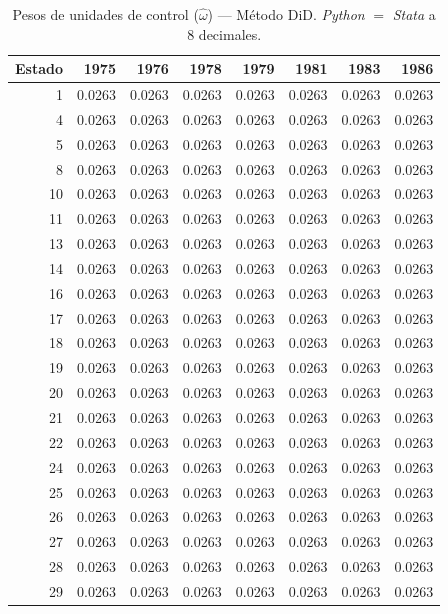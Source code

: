 \begin{table}[H]
\centering
\caption{Pesos de unidades de control ($\hat{\omega}$) --- M\'etodo DiD. \textit{Python} $=$ \textit{Stata} a 8 decimales.}
\label{tab:omega_did}
\small
\begin{tabular}{rrrrrrrr}
\toprule
Estado & 1975 & 1976 & 1978 & 1979 & 1981 & 1983 & 1986 \\
\midrule
1 & 0.0263 & 0.0263 & 0.0263 & 0.0263 & 0.0263 & 0.0263 & 0.0263 \\
4 & 0.0263 & 0.0263 & 0.0263 & 0.0263 & 0.0263 & 0.0263 & 0.0263 \\
5 & 0.0263 & 0.0263 & 0.0263 & 0.0263 & 0.0263 & 0.0263 & 0.0263 \\
8 & 0.0263 & 0.0263 & 0.0263 & 0.0263 & 0.0263 & 0.0263 & 0.0263 \\
10 & 0.0263 & 0.0263 & 0.0263 & 0.0263 & 0.0263 & 0.0263 & 0.0263 \\
11 & 0.0263 & 0.0263 & 0.0263 & 0.0263 & 0.0263 & 0.0263 & 0.0263 \\
13 & 0.0263 & 0.0263 & 0.0263 & 0.0263 & 0.0263 & 0.0263 & 0.0263 \\
14 & 0.0263 & 0.0263 & 0.0263 & 0.0263 & 0.0263 & 0.0263 & 0.0263 \\
16 & 0.0263 & 0.0263 & 0.0263 & 0.0263 & 0.0263 & 0.0263 & 0.0263 \\
17 & 0.0263 & 0.0263 & 0.0263 & 0.0263 & 0.0263 & 0.0263 & 0.0263 \\
18 & 0.0263 & 0.0263 & 0.0263 & 0.0263 & 0.0263 & 0.0263 & 0.0263 \\
19 & 0.0263 & 0.0263 & 0.0263 & 0.0263 & 0.0263 & 0.0263 & 0.0263 \\
20 & 0.0263 & 0.0263 & 0.0263 & 0.0263 & 0.0263 & 0.0263 & 0.0263 \\
21 & 0.0263 & 0.0263 & 0.0263 & 0.0263 & 0.0263 & 0.0263 & 0.0263 \\
22 & 0.0263 & 0.0263 & 0.0263 & 0.0263 & 0.0263 & 0.0263 & 0.0263 \\
24 & 0.0263 & 0.0263 & 0.0263 & 0.0263 & 0.0263 & 0.0263 & 0.0263 \\
25 & 0.0263 & 0.0263 & 0.0263 & 0.0263 & 0.0263 & 0.0263 & 0.0263 \\
26 & 0.0263 & 0.0263 & 0.0263 & 0.0263 & 0.0263 & 0.0263 & 0.0263 \\
27 & 0.0263 & 0.0263 & 0.0263 & 0.0263 & 0.0263 & 0.0263 & 0.0263 \\
28 & 0.0263 & 0.0263 & 0.0263 & 0.0263 & 0.0263 & 0.0263 & 0.0263 \\
29 & 0.0263 & 0.0263 & 0.0263 & 0.0263 & 0.0263 & 0.0263 & 0.0263 \\

\end{tabular}
\end{table}
